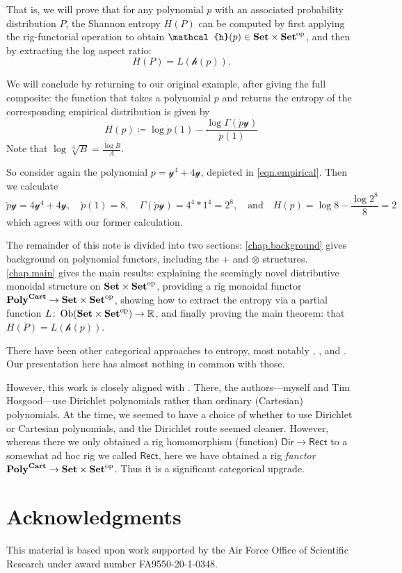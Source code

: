 \documentclass[11pt, one side, article]{memoir}
\theoremstyle{definition}
\theoremstyle{plain}
\DeclareMathOperator{\ob}{Ob}
\newcommand{\Set}[1]{\mathsf{#1}}%
\newcommand{\Cat}[1]{\mathbf{#1}}%
\newcommand{\op}{^\tn{op}}
\newcommand{\tn}[1]{\textnormal{#1}}
\newcommand{\rr}{\mathbb{R}}
\newcommand{\smset}{\Cat{Set}}
\newcommand{\yon}{\mathcal{y}}
\newcommand{\poly}{\Cat{Poly}}
\newcommand{\dir}{\Set{Dir}}
\newcommand{\rect}{\Set{Rect}}
\newcommand{\polycart}{\poly^{\Cat{Cart}}}
\newcommand{\hh}{\mathcal{h}}
\newcommand{\0}{\textsf{0}}
\newcommand{\1}{\tn{\textsf{1}}}
\newcommand{\qand}{\quad\text{and}\quad}
\begin{document}
That is, we will prove that for any polynomial $p$ with an associated probability distribution $P$, the Shannon entropy $H(P)$ can be computed by first applying the rig-functorial operation to obtain $\hh(p)\in\smset\times\smset\op$, and then by extracting the log aspect ratio:
\[
H(P)=L(\hh(p)).
\]

We will conclude by returning to our original example, after giving the full composite: the function that takes a polynomial $p$ and returns the entropy of the corresponding empirical distribution is given by
\[
  H(p)\coloneqq\log \dot{p}(1)-\frac{\log\Gamma(\dot{p}\yon)}{\dot{p}(1)}
\]
Note that $\log\sqrt[A]{B}=\frac{\log B}{A}$.

So consider again the polynomial $p=\yon^4+4\yon$, depicted in \eqref{eqn.empirical}. Then we calculate
\[
\dot{p}\yon=4\yon^4+4\yon
,\quad
\dot{p}(1)=8
,\quad
\Gamma(\dot{p}\yon)=4^4*1^4=2^8
,\qand 
H(p)=\log 8-\frac{\log 2^8}{8}=2
\]
which agrees with our former calculation. 

The remainder of this note is divided into two sections: \cref{chap.background} gives background on polynomial functors, including the $+$ and $\otimes$ structures. \cref{chap.main} gives the main results: explaining the seemingly novel distributive monoidal structure on $\smset\times\smset\op$, providing a rig monoidal functor $\polycart\to\smset\times\smset\op$, showing how to extract the entropy via a partial function $L\colon\ob(\smset\times\smset\op)\to\rr$, and finally proving the main theorem: that $H(P)=L(\hh(p))$.

There have been other categorical approaches to entropy, most notably \cite{baez2011characterization}, \cite{baez2014bayesian}, and \cite{leinster2021entropy}. Our presentation here has almost nothing in common with those. 

However, this work is closely aligned with \cite{spivak2021dirichlet}. There, the authors---myself and Tim Hosgood---use Dirichlet polynomials rather than ordinary (Cartesian) polynomials. At the time, we seemed to have a choice of whether to use Dirichlet or Cartesian polynomials, and the Dirichlet route seemed cleaner. However, whereas there we only obtained a rig homomorphism (function) $\dir\to\rect$ to a somewhat ad hoc rig we called $\rect$, here we have obtained a rig \emph{functor} $\polycart\to\smset\times\smset\op$. Thus it is a significant categorical upgrade.

\section*{Acknowledgments}
This material is based upon work supported by the Air Force Office of Scientific Research under award number FA9550-20-1-0348.
\end{document}
